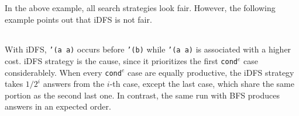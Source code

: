 \documentclass[format=acmlarge, review=true, authordraft=true]{acmart}
\newcommand{\conde}{\texttt{cond$^e$} }
\begin{document}

In the above example, all search strategies look fair. However, the following 
example points out that iDFS is not fair.

\begin{center}
  \begin{tabular}{c}
   
   \end{tabular}
\end{center}

With iDFS, \texttt{'(a a)} occurs before \texttt{'(b)} while \texttt{'(a a)} is 
associated with a higher cost. iDFS strategy is the cause, since it prioritizes 
the first \conde case considerablely. When every \conde case 
are equally productive, the iDFS strategy takes $1/2^{i}$ answers from the 
$i$-th case, except the last case, which share the same portion as the second 
last one. In contrast, the same run with BFS produces answers in an expected 
order.

\begin{center}
  \begin{tabular}{c}
   
   \end{tabular}
\end{center}
\end{document}
